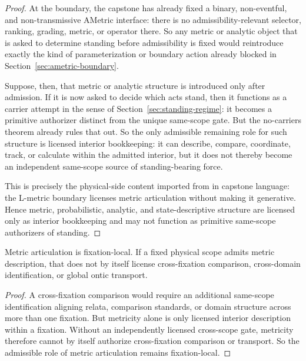 \begin{proof}
At the boundary, the capstone has already fixed a binary, non-eventful, and non-transmissive AMetric interface: there is no admissibility-relevant selector, ranking, grading, metric, or operator there. So any metric or analytic object that is asked to determine standing before admissibility is fixed would reintroduce exactly the kind of parameterization or boundary action already blocked in Section~\ref{sec:ametric-boundary}.

Suppose, then, that metric or analytic structure is introduced only after admission. If it is now asked to decide which acts stand, then it functions as a carrier attempt in the sense of Section~\ref{sec:standing-regime}: it becomes a primitive authorizer distinct from the unique same-scope gate. But the no-carriers theorem already rules that out. So the only admissible remaining role for such structure is licensed interior bookkeeping: it can describe, compare, coordinate, track, or calculate within the admitted interior, but it does not thereby become an independent same-scope source of standing-bearing force.

This is precisely the physical-side content imported from \clausuradoc{} in capstone language: the L-metric boundary licenses metric articulation without making it generative. Hence metric, probabilistic, analytic, and state-descriptive structure are licensed only as interior bookkeeping and may not function as primitive same-scope authorizers of standing.
\end{proof}

\begin{corollary}
Metric articulation is fixation-local. If a fixed physical scope admits metric description, that does not by itself license cross-fixation comparison, cross-domain identification, or global ontic transport.
\end{corollary}

\begin{proof}
A cross-fixation comparison would require an additional same-scope identification aligning relata, comparison standards, or domain structure across more than one fixation. But metricity alone is only licensed interior description within a fixation. Without an independently licensed cross-scope gate, metricity therefore cannot by itself authorize cross-fixation comparison or transport. So the admissible role of metric articulation remains fixation-local.
\end{proof}

